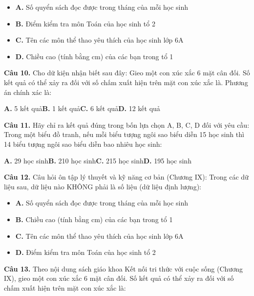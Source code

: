 \documentclass[11pt,a4paper]{article}
\begin{document}
\begin{itemize}\setlength{\itemsep}{1pt}\setlength{\parskip}{0pt}
  \item[] \textbf{A.} Số quyển sách đọc được trong tháng của mỗi học sinh
  \item[] \textbf{B.} Điểm kiểm tra môn Toán của học sinh tổ 2
  \item[] \textbf{C.} Tên các môn thể thao yêu thích của học sinh lớp 6A
  \item[] \textbf{D.} Chiều cao (tính bằng cm) của các bạn trong tổ 1
\end{itemize}\vspace{2pt}
\textbf{\color{primary} Câu 10.} Cho dữ kiện nhận biết sau đây: Gieo một con xúc xắc 6 mặt cân đối. Số kết quả có thể xảy ra đối với số chấm xuất hiện trên mặt con xúc xắc là. Phương án chính xác là:\par
\hspace*{1.5em}\textbf{A.} 5 kết quả\quad\quad \textbf{B.} 1 kết quả\quad\quad \textbf{C.} 6 kết quả\quad\quad \textbf{D.} 12 kết quả\par\vspace{2pt}
\textbf{\color{primary} Câu 11.} Hãy chỉ ra kết quả đúng trong bốn lựa chọn A, B, C, D đối với yêu cầu: Trong một biểu đồ tranh, nếu mỗi biểu tượng ngôi sao biểu diễn 15 học sinh thì 14 biểu tượng ngôi sao biểu diễn bao nhiêu học sinh:\par
\hspace*{1.5em}\textbf{A.} 29 học sinh\quad\quad \textbf{B.} 210 học sinh\quad\quad \textbf{C.} 215 học sinh\quad\quad \textbf{D.} 195 học sinh\par\vspace{2pt}
\textbf{\color{primary} Câu 12.} Câu hỏi ôn tập lý thuyết và kỹ năng cơ bản (Chương IX): Trong các dữ liệu sau, dữ liệu nào KHÔNG phải là số liệu (dữ liệu định lượng):\par
\begin{itemize}\setlength{\itemsep}{1pt}\setlength{\parskip}{0pt}
  \item[] \textbf{A.} Số quyển sách đọc được trong tháng của mỗi học sinh
  \item[] \textbf{B.} Chiều cao (tính bằng cm) của các bạn trong tổ 1
  \item[] \textbf{C.} Tên các môn thể thao yêu thích của học sinh lớp 6A
  \item[] \textbf{D.} Điểm kiểm tra môn Toán của học sinh tổ 2
\end{itemize}\vspace{2pt}
\textbf{\color{primary} Câu 13.} Theo nội dung sách giáo khoa Kết nối tri thức với cuộc sống (Chương IX), gieo một con xúc xắc 6 mặt cân đối. Số kết quả có thể xảy ra đối với số chấm xuất hiện trên mặt con xúc xắc là:\par
\end{document}

